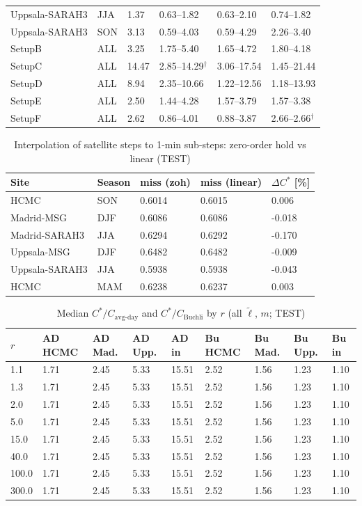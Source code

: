 \begin{table}[H]
\begin{tabular}{@{}llllll@{}}
Uppsala-SARAH3 & JJA & 1.37 & 0.63--1.82 & 0.63--2.10 & 0.74--1.82\\
Uppsala-SARAH3 & SON & 3.13 & 0.59--4.03 & 0.59--4.29 & 2.26--3.40\\
SetupB & ALL & 3.25 & 1.75--5.40 & 1.65--4.72 & 1.80--4.18\\
SetupC & ALL & 14.47 & 2.85--14.29$^\dagger$ & 3.06--17.54 & 1.45--21.44\\
SetupD & ALL & 8.94 & 2.35--10.66 & 1.22--12.56 & 1.18--13.93\\
SetupE & ALL & 2.50 & 1.44--4.28 & 1.57--3.79 & 1.57--3.38\\
SetupF & ALL & 2.62 & 0.86--4.01 & 0.88--3.87 & 2.66--2.66$^\dagger$\\
\bottomrule\end{tabular}\end{table}

\begin{table}[H]\centering\footnotesize\caption{Interpolation of satellite steps to 1-min sub-steps: zero-order hold vs linear (TEST)}\label{tab:s_interp}
\begin{tabular}{@{}lllll@{}}\toprule
Site & Season & miss (zoh) & miss (linear) & $\Delta C^*$ [\%]\\\midrule
HCMC & SON & 0.6014 & 0.6015 & 0.006\\
Madrid-MSG & DJF & 0.6086 & 0.6086 & -0.018\\
Madrid-SARAH3 & JJA & 0.6294 & 0.6292 & -0.170\\
Uppsala-MSG & DJF & 0.6482 & 0.6482 & -0.009\\
Uppsala-SARAH3 & JJA & 0.5938 & 0.5938 & -0.043\\
HCMC & MAM & 0.6238 & 0.6237 & 0.003\\
\bottomrule\end{tabular}\end{table}

\begin{table}[H]\centering\footnotesize\caption{Median $C^*/C_{\mathrm{avg\text{-}day}}$ and $C^*/C_{\mathrm{Buchli}}$ by $r$ (all $\tilde\ell$, $m$; TEST)}\label{tab:s_grid}
\begin{tabular}{@{}lllllllll@{}}\toprule
$r$ & AD HCMC & AD Mad. & AD Upp. & AD in & Bu HCMC & Bu Mad. & Bu Upp. & Bu in\\\midrule
1.1 & 1.71 & 2.45 & 5.33 & 15.51 & 2.52 & 1.56 & 1.23 & 1.10\\
1.3 & 1.71 & 2.45 & 5.33 & 15.51 & 2.52 & 1.56 & 1.23 & 1.10\\
2.0 & 1.71 & 2.45 & 5.33 & 15.51 & 2.52 & 1.56 & 1.23 & 1.10\\
5.0 & 1.71 & 2.45 & 5.33 & 15.51 & 2.52 & 1.56 & 1.23 & 1.10\\
15.0 & 1.71 & 2.45 & 5.33 & 15.51 & 2.52 & 1.56 & 1.23 & 1.10\\
40.0 & 1.71 & 2.45 & 5.33 & 15.51 & 2.52 & 1.56 & 1.23 & 1.10\\
100.0 & 1.71 & 2.45 & 5.33 & 15.51 & 2.52 & 1.56 & 1.23 & 1.10\\
300.0 & 1.71 & 2.45 & 5.33 & 15.51 & 2.52 & 1.56 & 1.23 & 1.10\\
\bottomrule\end{tabular}\end{table}
